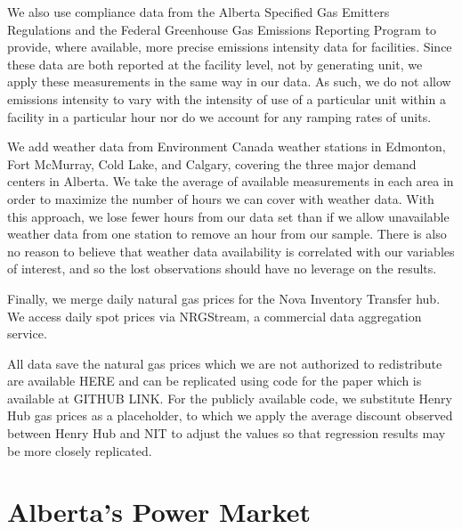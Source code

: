 \documentclass[12pt]{article}
\begin{document}
We also use compliance data from the Alberta Specified Gas Emitters Regulations and the Federal Greenhouse Gas Emissions Reporting Program to provide, where available, more precise emissions intensity data for facilities.  Since these data are both reported at the facility level, not by generating unit, we apply these measurements in the same way in our data.  As such, we do not allow emissions intensity to vary with the intensity of use of a particular unit within a facility in a particular hour nor do we account for any ramping rates of units.

We add weather data from Environment Canada weather stations in Edmonton, Fort McMurray, Cold Lake, and Calgary, covering the three major demand centers in Alberta.  We take the average of available measurements in each area in order to maximize the number of hours we can cover with weather data. With this approach, we lose fewer hours from our data set than if we allow unavailable weather data from one station to remove an hour from our sample. There is also no reason to believe that weather data availability is correlated with our variables of interest, and so the lost observations should have no leverage on the results.

Finally, we merge daily natural gas prices for the Nova Inventory Transfer hub.  We access daily spot prices via NRGStream, a commercial data aggregation service.

All data save the natural gas prices which we are not authorized to redistribute are available HERE and can be replicated using code for the paper which is available at GITHUB LINK. For the publicly available code, we substitute Henry Hub gas prices as a placeholder, to which we apply the average discount observed between Henry Hub and NIT to adjust the values so that regression results may be more closely replicated.

\section{Alberta's Power Market}
\end{document}

